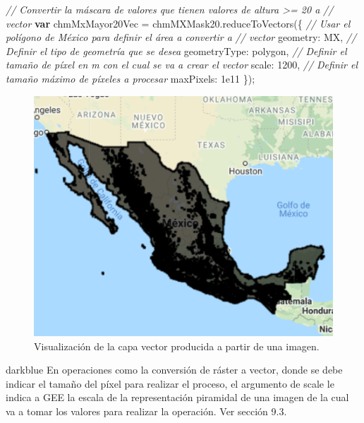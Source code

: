 \documentclass[
  12pt,
  letterpaper,
  twoside]{book}
\newenvironment{Shaded}{\begin{snugshade}}{\end{snugshade}}
\newcommand{\CommentTok}[1]{\textcolor[rgb]{0.24,0.58,0.00}{\textit{#1}}}
\newcommand{\ControlFlowTok}[1]{\textcolor[rgb]{0.00,0.00,0.00}{\textbf{#1}}}
\newcommand{\DataTypeTok}[1]{\textcolor[rgb]{0.00,0.00,0.00}{#1}}
\newcommand{\DecValTok}[1]{\textcolor[rgb]{0.28,0.53,0.93}{#1}}
\newcommand{\FloatTok}[1]{\textcolor[rgb]{0.28,0.53,0.93}{#1}}
\newcommand{\FunctionTok}[1]{\textcolor[rgb]{0.48,0.12,0.64}{#1}}
\newcommand{\NormalTok}[1]{#1}
\newcommand{\OperatorTok}[1]{\textcolor[rgb]{0.00,0.00,0.00}{#1}}
\newcommand{\StringTok}[1]{\textcolor[rgb]{0.87,0.29,0.22}{#1}}
\begin{document}
\begin{Shaded}
\begin{Highlighting}[]
\CommentTok{// Convertir la máscara de valores que tienen valores de altura \textgreater{}= 20 a }
\CommentTok{// vector}
\ControlFlowTok{var}\NormalTok{ chmMxMayor20Vec }\OperatorTok{=}\NormalTok{ chmMXMask20}\OperatorTok{.}\FunctionTok{reduceToVectors}\NormalTok{(\{}
     \CommentTok{// Usar el polígono de México para definir el área a convertir a }
     \CommentTok{// vector}
  \DataTypeTok{geometry}\OperatorTok{:}\NormalTok{ MX}\OperatorTok{,}
\CommentTok{// Definir el tipo de geometría que se desea}
  \DataTypeTok{geometryType}\OperatorTok{:} \StringTok{\textquotesingle{}polygon\textquotesingle{}}\OperatorTok{,}
\CommentTok{// Definir el tamaño de píxel en m con el cual se va a crear el vector}
  \DataTypeTok{scale}\OperatorTok{:} \DecValTok{1200}\OperatorTok{,}
\CommentTok{// Definir el tamaño máximo de píxeles a procesar}
  \DataTypeTok{maxPixels}\OperatorTok{:} \FloatTok{1e11}
\NormalTok{\})}\OperatorTok{;}
\end{Highlighting}
\end{Shaded}

\begin{figure}[H]

{\centering \includegraphics[width=0.95\linewidth]{Img/mexicoVector} 

}

\caption{Visualización de la capa vector producida a partir de una imagen.}\label{fig:f99}
\end{figure}

\begin{bluebox2}

\begin{awesomeblock}{5pt}{\faLightbulb}{darkblue}
En operaciones como la conversión de ráster a vector, donde se debe indicar el tamaño del píxel para realizar el proceso, el argumento de scale le indica a GEE la escala de la representación piramidal de una imagen de la cual va a tomar los valores para realizar la operación. Ver sección 9.3.

\end{awesomeblock}

\end{bluebox2}
\end{document}
